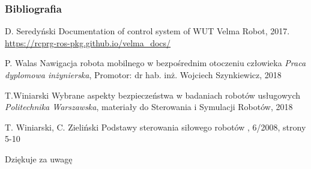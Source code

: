 
\begin{frame}[plain]
\addtocounter{framenumber}{-1}
\frametitle{Bibliografia}
\footnotesize{
\begin{thebibliography}{99} %
 D. Seredyński
\newblock Documentation of control system of WUT Velma Robot, 2017.
\newblock \url{https://rcprg-ros-pkg.github.io/velma\_docs/}

 P. Walas
\newblock Nawigacja robota mobilnego w bezpośrednim otoczeniu człowieka
\newblock \emph{Praca dyplomowa inżynierska}, Promotor: dr hab. inż. Wojciech Szynkiewicz, 2018

 T.Winiarski
\newblock Wybrane aspekty bezpieczeństwa w badaniach robotów usługowych
\newblock \emph{Politechnika Warszawska}, materiały do Sterowania i Symulacji Robotów, 2018 

 T. Winiarski, C. Zieliński
\newblock Podstawy sterowania siłowego robotów
, 6/2008, strony 5-10




\end{thebibliography}
}
\end{frame}


\begin{frame}[plain]
\addtocounter{framenumber}{-1}
\Huge{\centerline{Dziękuje za uwagę}}
\end{frame}
